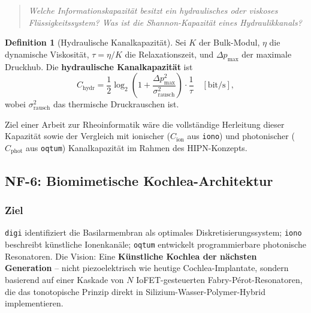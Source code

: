 ﻿\documentclass[a4paper,12pt]{scrreprt}
\theoremstyle{definition}
\newtheorem{definition}{Definition}[section]
\begin{document}
\begin{quote}
  \itshape
  Welche Informationskapazität besitzt ein hydraulisches oder
  viskoses Flüssigkeitssystem? Was ist die \emph{Shannon-Kapazität
  eines Hydraulikkanals}?
\end{quote}

\begin{definition}[Hydraulische Kanalkapazität]
  Sei $K$ der Bulk-Modul, $\eta$ die dynamische Viskosität, $\tau = \eta/K$
  die Relaxationszeit, und $\Delta p_{\max}$ der maximale Druckhub. Die
  \textbf{hydraulische Kanalkapazität} ist
  \[
    C_{\text{hydr}} = \frac{1}{2} \log_2\!\left(1 +
      \frac{\Delta p_{\max}^2}{\sigma_{\mathrm{rausch}}^2}\right)
      \cdot \frac{1}{\tau} \quad [\text{bit/s}],
  \]
  wobei $\sigma_{\mathrm{rausch}}^2$ das thermische Druckrauschen ist.
\end{definition}

Ziel einer Arbeit zur Rheoinformatik wäre die vollständige Herleitung
dieser Kapazität sowie der Vergleich mit ionischer ($C_{\text{ion}}$ aus
\texttt{iono}) und photonischer ($C_{\text{phot}}$ aus \texttt{oqtum})
Kanalkapazität im Rahmen des HIPN-Konzepts.

\subsection{NF-6: Biomimetische Kochlea-Architektur}

\subsubsection{Ziel}

\texttt{digi} identifiziert die Basilarmembran als optimales
Diskretisierungssystem; \texttt{iono} beschreibt künstliche Ionenkanäle;
\texttt{oqtum} entwickelt programmierbare photonische Resonatoren.
Die Vision: Eine \textbf{Künstliche Kochlea der nächsten Generation} --
nicht piezoelektrisch wie heutige Cochlea-Implantate, sondern basierend
auf einer Kaskade von $N$ IoFET-gesteuerten Fabry-Pérot-Resonatoren,
die das tonotopische Prinzip direkt in Silizium-Wasser-Polymer-Hybrid
implementieren.
\end{document}
